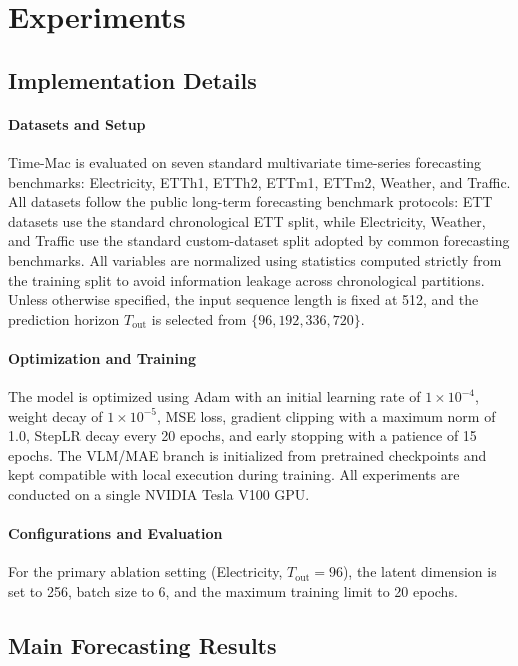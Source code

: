 \documentclass[journal]{IEEEtran}
\begin{document}
\section{Experiments}

\subsection{Implementation Details}

\paragraph{Datasets and Setup}
Time-Mac is evaluated on seven standard multivariate time-series forecasting benchmarks: Electricity, ETTh1, ETTh2, ETTm1, ETTm2, Weather, and Traffic. All datasets follow the public long-term forecasting benchmark protocols: ETT datasets use the standard chronological ETT split, while Electricity, Weather, and Traffic use the standard custom-dataset split adopted by common forecasting benchmarks. All variables are normalized using statistics computed strictly from the training split to avoid information leakage across chronological partitions. Unless otherwise specified, the input sequence length is fixed at 512, and the prediction horizon $T_{\text{out}}$ is selected from $\{96, 192, 336, 720\}$.

\paragraph{Optimization and Training}
The model is optimized using Adam with an initial learning rate of $1\times10^{-4}$, weight decay of $1\times10^{-5}$, MSE loss, gradient clipping with a maximum norm of 1.0, StepLR decay every 20 epochs, and early stopping with a patience of 15 epochs. The VLM/MAE branch is initialized from pretrained checkpoints and kept compatible with local execution during training. All experiments are conducted on a single NVIDIA Tesla V100 GPU.

\paragraph{Configurations and Evaluation}
For the primary ablation setting (Electricity, $T_{\text{out}}=96$), the latent dimension is set to 256, batch size to 6, and the maximum training limit to 20 epochs.

\subsection{Main Forecasting Results}
\end{document}
